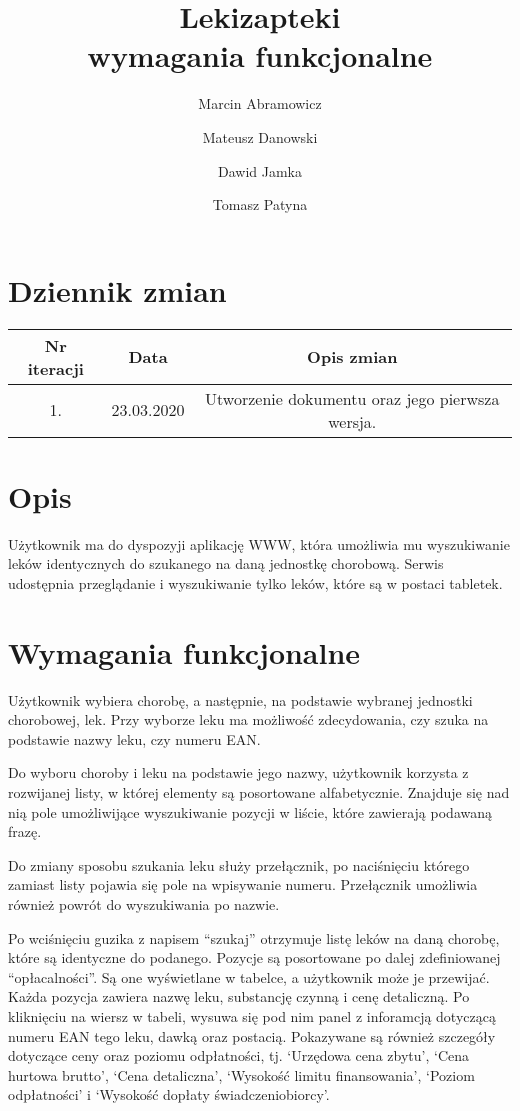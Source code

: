 \documentclass{article}
\title{
Lekizapteki\\
\large wymagania funkcjonalne}
\author{Marcin Abramowicz \and Mateusz Danowski \and Dawid Jamka \and Tomasz Patyna}
\begin{document}
  \maketitle

  \section{Dziennik zmian}
  \begin{tabular}{|c|c|c|}
    Nr iteracji & Data & Opis zmian \\
    \hline
    1. & 23.03.2020 & Utworzenie dokumentu oraz jego pierwsza wersja. \\
  \end{tabular}

  \section{Opis}
  Użytkownik ma do dyspozyji aplikację WWW, która umożliwia mu wyszukiwanie leków identycznych do szukanego na daną jednostkę chorobową.
  Serwis udostępnia przeglądanie i wyszukiwanie tylko leków, które są w postaci tabletek.

  \section{Wymagania funkcjonalne}
  Użytkownik wybiera chorobę, a następnie, na podstawie wybranej jednostki chorobowej, lek.
  Przy wyborze leku ma możliwość zdecydowania, czy szuka na podstawie nazwy leku, czy numeru EAN.

  Do wyboru choroby i leku na podstawie jego nazwy, użytkownik korzysta z rozwijanej listy, w której elementy są posortowane alfabetycznie.
  Znajduje się nad nią pole umożliwijące wyszukiwanie pozycji w liście, które zawierają podawaną frazę.

  Do zmiany sposobu szukania leku służy przełącznik, po naciśnięciu którego zamiast listy pojawia się pole na wpisywanie numeru.
  Przełącznik umożliwia również powrót do wyszukiwania po nazwie.

  Po wciśnięciu guzika z napisem ``szukaj'' otrzymuje listę leków na daną chorobę, które są identyczne do podanego.
  Pozycje są posortowane po dalej zdefiniowanej ``opłacalności''.
  Są one wyświetlane w tabelce, a użytkownik może je przewijać.
  Każda pozycja zawiera nazwę leku, substancję czynną i cenę detaliczną.
  Po kliknięciu na wiersz w tabeli, wysuwa się pod nim panel z inforamcją dotyczącą numeru EAN tego leku, dawką oraz postacią.
  Pokazywane są również szczegóły dotyczące ceny oraz poziomu odpłatności, tj.
  `Urzędowa cena zbytu',
  `Cena hurtowa brutto',
  `Cena detaliczna',
  `Wysokość limitu finansowania',
  `Poziom odpłatności' i
  `Wysokość dopłaty świadczeniobiorcy'.
\end{document}
